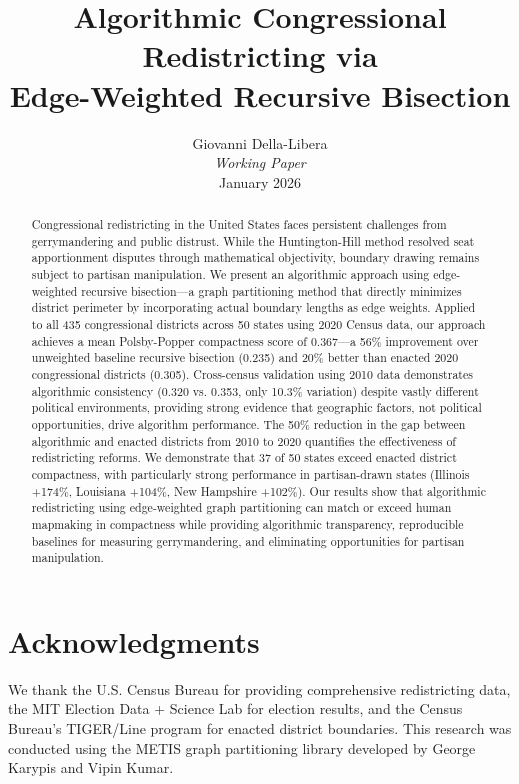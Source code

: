 \documentclass[11pt,twocolumn]{article}
\title{\textbf{Algorithmic Congressional Redistricting via\\Edge-Weighted Recursive Bisection}}
\author{
Giovanni Della-Libera\\
\textit{Working Paper}\\
January 2026
}
\date{}
\begin{document}
\maketitle

\begin{abstract}
Congressional redistricting in the United States faces persistent challenges from gerrymandering and public distrust. While the Huntington-Hill method resolved seat apportionment disputes through mathematical objectivity, boundary drawing remains subject to partisan manipulation. We present an algorithmic approach using edge-weighted recursive bisection—a graph partitioning method that directly minimizes district perimeter by incorporating actual boundary lengths as edge weights. Applied to all 435 congressional districts across 50 states using 2020 Census data, our approach achieves a mean Polsby-Popper compactness score of 0.367—a 56\% improvement over unweighted baseline recursive bisection (0.235) and 20\% better than enacted 2020 congressional districts (0.305). Cross-census validation using 2010 data demonstrates algorithmic consistency (0.320 vs. 0.353, only 10.3\% variation) despite vastly different political environments, providing strong evidence that geographic factors, not political opportunities, drive algorithm performance. The 50\% reduction in the gap between algorithmic and enacted districts from 2010 to 2020 quantifies the effectiveness of redistricting reforms. We demonstrate that 37 of 50 states exceed enacted district compactness, with particularly strong performance in partisan-drawn states (Illinois +174\%, Louisiana +104\%, New Hampshire +102\%). Our results show that algorithmic redistricting using edge-weighted graph partitioning can match or exceed human mapmaking in compactness while providing algorithmic transparency, reproducible baselines for measuring gerrymandering, and eliminating opportunities for partisan manipulation.
\end{abstract}










\section*{Acknowledgments}
We thank the U.S. Census Bureau for providing comprehensive redistricting data, the MIT Election Data + Science Lab for election results, and the Census Bureau's TIGER/Line program for enacted district boundaries. This research was conducted using the METIS graph partitioning library developed by George Karypis and Vipin Kumar.



\end{document}
